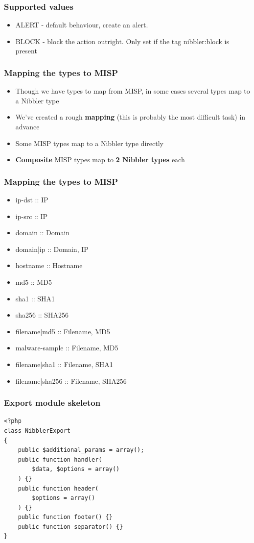 \begin{frame}
  \frametitle{Supported values}
  \begin{itemize}
    \item ALERT - default behaviour, create an alert.
    \item BLOCK - block the action outright. Only set if the tag nibbler:block is present
  \end{itemize}
\end{frame}

\begin{frame}
  \frametitle{Mapping the types to MISP}
  \begin{itemize}
    \item Though we have types to map from MISP, in some cases several types map to a Nibbler type
    \item We've created a rough {\bf mapping} (this is probably the most difficult task) in advance
    \item Some MISP types map to a Nibbler type directly
    \item {\bf Composite} MISP types map to {\bf 2 Nibbler types} each
  \end{itemize}
\end{frame}

\begin{frame}
  \frametitle{Mapping the types to MISP}
  \begin{itemize}
    \item ip-dst :: IP
    \item ip-src :: IP
    \item domain :: Domain
    \item domain|ip :: Domain, IP
    \item hostname :: Hostname
    \item md5 :: MD5
    \item sha1 :: SHA1
    \item sha256 :: SHA256
    \item filename|md5 :: Filename, MD5
    \item malware-sample :: Filename, MD5
    \item filename|sha1 :: Filename, SHA1
    \item filename|sha256 :: Filename, SHA256
  \end{itemize}
\end{frame}

\begin{frame}[fragile]
  \frametitle{Export module skeleton}
  \begin{lstlisting}
<?php
class NibblerExport
{
    public $additional_params = array();
    public function handler(
        $data, $options = array()
    ) {}
    public function header(
        $options = array()
    ) {}
    public function footer() {}
    public function separator() {}
}
  \end{lstlisting}
\end{frame}

